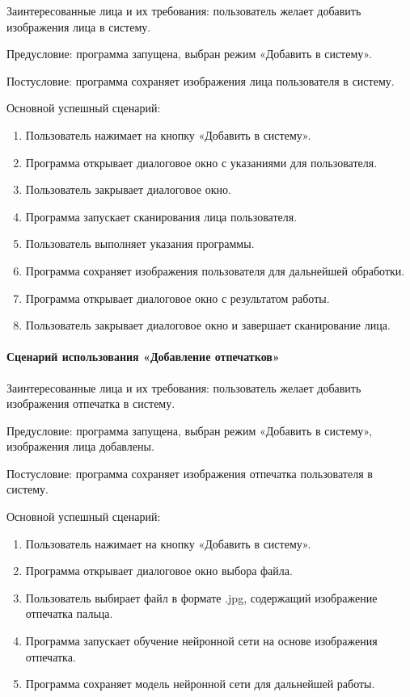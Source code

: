 Заинтересованные лица и их требования: пользователь желает добавить изображения лица в систему.

Предусловие: программа запущена, выбран режим «Добавить в систему».

Постусловие: программа сохраняет изображения лица пользователя  в систему.

Основной успешный сценарий:
\begin{enumerate}
	\item Пользователь нажимает на кнопку «Добавить в систему».
	\item Программа открывает диалоговое окно с указаниями для пользователя.
	\item Пользователь закрывает диалоговое окно.
	\item Программа запускает сканирования лица пользователя.
	\item Пользователь выполняет указания программы.
	\item Программа сохраняет изображения пользователя для дальнейшей обработки.
	\item Программа открывает диалоговое окно с результатом работы.
	\item Пользователь закрывает диалоговое окно и завершает сканирование лица.
\end{enumerate}

\paragraph{Сценарий использования «Добавление отпечатков»}

Заинтересованные лица и их требования: пользователь желает добавить изображения отпечатка в систему.

Предусловие: программа запущена, выбран режим «Добавить в систему», изображения лица добавлены.

Постусловие: программа сохраняет изображения отпечатка пользователя в систему.

Основной успешный сценарий:
\begin{enumerate}
	\item Пользователь нажимает на кнопку «Добавить в систему».
	\item Программа открывает диалоговое окно выбора файла.
	\item Пользователь выбирает файл в формате .jpg, содержащий изображение отпечатка пальца.
	\item Программа запускает обучение нейронной сети на основе изображения отпечатка.
	\item Программа сохраняет модель нейронной сети для дальнейшей работы.
\end{enumerate}


